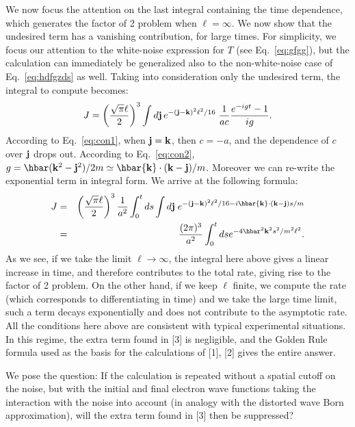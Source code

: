 \documentclass[12pt,onecolumn,amssymb,nofootinbib]{revtex4-2} %
\begin{document}
We now focus the attention on the last integral containing the time dependence, which generates the factor of 2 problem when $\ell = \infty$. We now show that the undesired term has a vanishing contribution, for large times. For simplicity, we focus our attention to the white-noise expression for $T$ (see Eq.~\eqref{eq:gfgg}), but the calculation can immediately be generalized also to the non-white-noise case of Eq.~\eqref{eq:hdfgzds} as well. Taking into consideration only the undesired term, the integral to compute becomes:
\begin{equation}
J = \left( \frac{\sqrt{\pi} \ell}{2} \right)^3 \int d {\bf j} \, e^{- ({\bf j} - {\bf k})^2 \ell^2 / 16}\; \frac{1}{ac} \frac{e^{-igt} - 1}{ig}.
\end{equation}
According to Eq.~\eqref{eq:con1}, when ${\bf j} = {\bf k}$, then $c = -a$, and the dependence of $c$ over ${\bf j}$ drops out. According to Eq.~\eqref{eq:con2}, $g = \hbar ({\bf k}^2 - {\bf j}^2)/2m \simeq \hbar {\bf k} \cdot ({\bf k} - {\bf j})/m$.  Moreover we can re-write the exponential term in integral form. We arrive at the following formula:
\begin{eqnarray}
J & = & \left( \frac{\sqrt{\pi} \ell}{2} \right)^3 \frac{1}{a^2} \int_{0}^{t} ds \int d {\bf j}\; e^{- ({\bf j} - {\bf k})^2 \ell^2 / 16 -i\hbar {\bf k} \cdot ({\bf k} - {\bf j})s/m} \nonumber \\
& = &
\frac{(2\pi)^3}{a^2} \int_{0}^{t} ds e^{- 4 \hbar^2 {\bf k}^2 s^2 / m^2 \ell^2}.
\end{eqnarray}
As we see, if we take the limit $\ell \rightarrow \infty$, the integral here above gives a linear increase in time, and therefore contributes to the total rate, giving rise to the factor of 2 problem. On the other hand, if we keep $\ell$ finite, we compute the rate (which corresponds to differentiating in time) and we  take the large time limit, such a term decays exponentially and does not contribute to the asymptotic rate. 
All the conditions here above are consistent with typical experimental situations.  In this regime,
the extra term found in [3] is negligible, and the Golden Rule formula used as the basis for the
calculations of [1], [2] gives the entire answer.



We pose the
question: If the calculation is repeated without a spatial cutoff on
the noise, but with the initial and final electron wave functions
taking the interaction with the noise into account (in analogy with
the distorted wave Born approximation), will the extra term found in
[3] then be suppressed?
\end{document}
